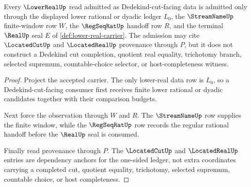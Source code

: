 \begin{theorem}
\label{thm:lowerreal-dedekind-cut-carrier-admission}
Every $\LowerRealUp$ read admitted as Dedekind-cut-facing data is admitted only through the displayed lower rational or dyadic ledger $L_0$, the $\StreamNameUp$ finite-window row $W$, the $\RegSeqRatUp$ handoff row $R$, and the terminal $\RealUp$ seal $E$ of \autoref{def:lower-real-carrier}. The admission may cite $\LocatedCutUp$ and $\LocatedRealUp$ provenance through $P$, but it does not construct a Dedekind cut completion, quotient real equality, trichotomy branch, selected supremum, countable-choice selector, or host-completeness witness.
\end{theorem}
\begin{proof}
Project the accepted carrier. The only lower-real data row is $L_0$, so a Dedekind-cut-facing consumer first receives finite lower rational or dyadic candidates together with their comparison budgets.

Next force the observation through $W$ and $R$. The $\StreamNameUp$ row supplies the finite window, while the $\RegSeqRatUp$ row records the regular rational handoff before the $\RealUp$ seal is consumed.

Finally read provenance through $P$. The $\LocatedCutUp$ and $\LocatedRealUp$ entries are dependency anchors for the one-sided ledger, not extra coordinates carrying a completed cut, quotient equality, trichotomy, selected supremum, countable choice, or host completeness.
\end{proof}


